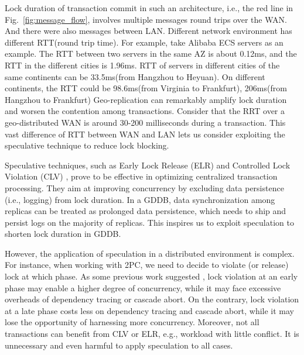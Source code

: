 \documentclass[conference]{IEEEtran}
\begin{document}
\begin{highlighted}
Lock duration of transaction commit in such an architecture, i.e., the red line in Fig.~\ref{fig:message_flow}, involves multiple messages round trips over the WAN.
And there were also messages between LAN.
Different network environment has different RTT(round trip time).
For example, take Alibaba ECS servers as an example.
The RTT between two servers in the same AZ is about 0.12ms, and the RTT in the different cities is 1.96ms.
RTT of servers in different cities of the same continents can be 33.5ms(from Hangzhou to Heyuan).
On different continents, the RTT could be 98.6ms(from Virginia to Frankfurt), 206ms(from Hangzhou to Frankfurt)
Geo-replication can remarkably amplify lock duration and worsen the contention among transactions.
Consider that the RRT over a geo-distributed WAN is around 30-200 milliseconds during a transaction. 
This vast difference of RTT between WAN and LAN lets us consider exploiting the speculative technique to reduce lock blocking.
\end{highlighted}
Speculative techniques, such as Early Lock Release (ELR) \cite{EfficientLocking:conf/vldb/KimuraGK12} and Controlled Lock Violation (CLV)
\cite{CLV:conf/sigmod/GraefeLKTV13}, prove to be effective in optimizing centralized transaction processing.
They aim at improving concurrency by excluding data persistence (i.e., logging) from lock duration.
In a GDDB, data synchronization among replicas can be treated as prolonged data persistence, which needs to ship and persist logs on the majority of replicas.
This inspires us to exploit speculation to shorten lock duration in GDDB.

However, the application of speculation in a distributed environment is complex.
For instance, when working with 2PC, we need to decide to violate (or release) lock at which phase.
As some previous work suggested \cite{CLV:conf/sigmod/GraefeLKTV13}, lock violation at an early phase may enable a higher degree of concurrency,
while it may face excessive overheads of dependency tracing or cascade abort.
On the contrary, lock violation at a late phase costs less on dependency tracing and cascade abort,
while it may lose the opportunity of harnessing more concurrency.
Moreover, not all transactions can benefit from CLV or ELR, e.g., workload with little conflict.
It is unnecessary and even harmful to apply speculation to all cases.
\end{document}

